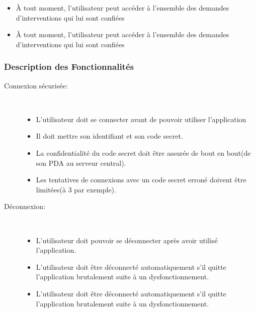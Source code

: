 \begin{enumerate}
\begin{itemize}
    \item À tout moment, l’utilisateur peut accéder à l’ensemble des demandes d’interventions 
    qui lui sont confiées

    \item À tout moment, l’utilisateur peut accéder à l’ensemble des demandes d’interventions qui lui sont confiées

	\end{itemize}
\end{enumerate}


\subsubsection{Description des Fonctionnalités}

\begin{description}
\item [Connexion sécurisée:] \hfill\\
	\begin{itemize}
	\item L'utilisateur doit se connecter avant de pouvoir utiliser l'application\\
	\item Il doit mettre son identifiant et son code secret.\\
	\item La confidentialité du code secret doit être assurée de bout en bout(de son PDA au serveur central).\\
	\item Les tentatives de connexions avec un code secret erroné doivent être limitées(à 3 par exemple).
	\end{itemize}

\item [Déconnexion:]\hfill\\
	\begin{itemize}
	\item L'utilisateur doit pouvoir se déconnecter après avoir utilisé l'application.\\

	\item L'utilisateur doit être déconnecté automatiquement s'il quitte l'application 
	brutalement suite à un dysfonctionnement.\\

	\item L'utilisateur doit être déconnecté automatiquement s'il quitte l'application brutalement suite à un dysfonctionnement.\\


\end{itemize}
\end{description}
